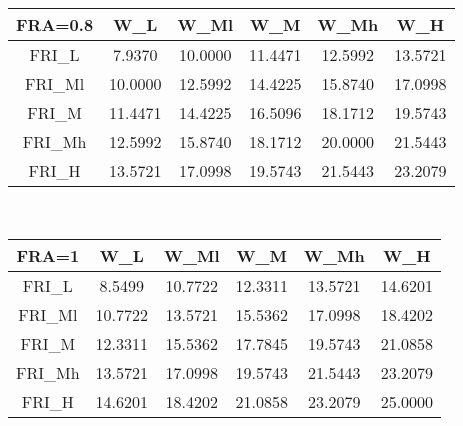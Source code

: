 \begin{table}[h]
    	
    	\begin{tabular}{|c||c|c|c|c|c|}
    		\hline
    		FRA=0.8	 &W_L&W_Ml&W_M&W_Mh&W_H\\
    		\hline  
    		\hline  
    		FRI_L&7.9370  & 10.0000 &  11.4471  & 12.5992  & 13.5721\\
    		FRI_{Ml}&10.0000 &  12.5992 &  14.4225 &  15.8740 &  17.0998\\
    		FRI_M&11.4471 &  14.4225 &  16.5096 &  18.1712 &  19.5743\\
    		FRI_{Mh}&12.5992 &  15.8740 &  18.1712 &  20.0000 &  21.5443\\
    		FRI_H&13.5721 &  17.0998 &  19.5743 &  21.5443 &  23.2079\\
    		\hline 
    	\end{tabular} 
    	\bigskip
    	\\
    	\pagebreak
    	\begin{tabular}{|c||c|c|c|c|c|}
    		\hline
    		FRA=1	 &W_L&W_Ml&W_M&W_Mh&W_H\\
    		\hline  
    		\hline  
    		FRI_L&8.5499  & 10.7722 &  12.3311  & 13.5721 &  14.6201\\
    		FRI_{Ml}&10.7722 &  13.5721 &  15.5362 &  17.0998 &  18.4202\\
    		FRI_M&12.3311 & 15.5362  & 17.7845  & 19.5743  & 21.0858\\
    		FRI_{Mh}&13.5721 &  17.0998 &  19.5743 &  21.5443 &  23.2079\\
    		FRI_H&14.6201 &  18.4202 &  21.0858 &  23.2079 &  25.0000\\
    		\hline 
    	\end{tabular} 
    	\bigskip
    	\\
    \end{table}


